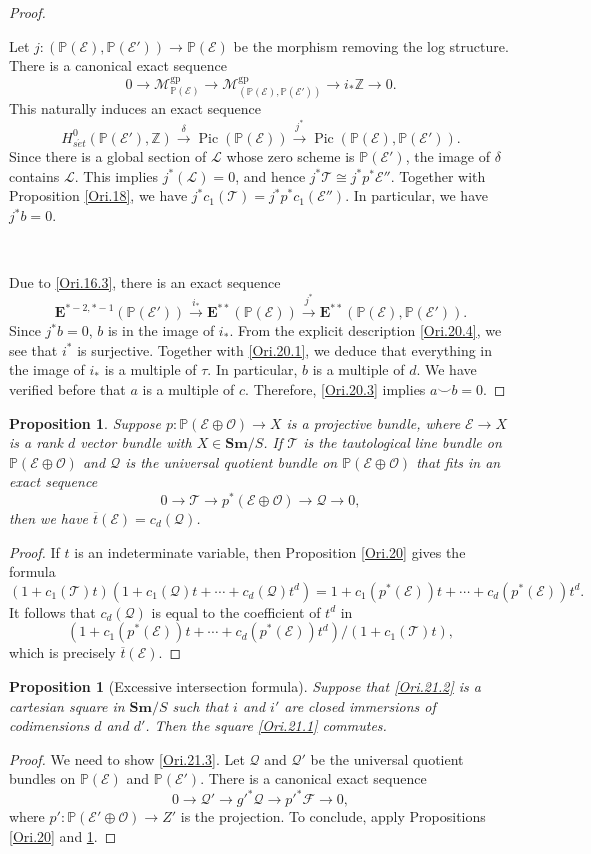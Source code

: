 \documentclass[11pt, a4paper]{amsart}
\newtheorem{prop}[thm]{Proposition}
\theoremstyle{definition}
\numberwithin{equation}{subsection}
\newcommand{\Z}{\mathbb{Z}}
\renewcommand{\P}{\mathbb{P}}
\newcommand{\Sm}{\mathbf{Sm}}
\newcommand{\Pic}{\operatorname{Pic}}		 %
\newcommand{\ol}{\overline}
\newcommand{\gp}{{\mathrm{gp}}}
\newcommand{\set}{{s\acute{e}t}}
\newcommand{\cE}{\mathcal{E}}
\newcommand{\cF}{\mathcal{F}}
\newcommand{\cL}{\mathcal{L}}
\newcommand{\cM}{\mathcal{M}}
\newcommand{\cO}{\mathcal{O}}
\newcommand{\cQ}{\mathcal{Q}}
\newcommand{\cT}{\mathcal{T}}
\newcommand{\ringE}{\mathbf{E}}
\begin{document}
\begin{proof}
\

Let $j\colon (\P(\cE),\P(\cE'))\to \P(\cE)$ be the morphism removing the log structure.
There is a canonical exact sequence
\[
0\to \cM_{\P(\cE)}^\gp \to \cM_{(\P(\cE),\P(\cE'))}^\gp \to i_*\Z\to 0.
\]
This naturally induces an exact sequence
\[
H_{\set}^0(\P(\cE'),\Z)
\xrightarrow{\delta}
\Pic(\P(\cE))
\xrightarrow{j^*}
\Pic(\P(\cE),\P(\cE')).
\]
Since there is a global section of $\cL$ whose zero scheme is $\P(\cE')$, the image of $\delta$ contains $\cL$.
This implies $j^*(\cL)=0$, and hence $j^*\cT\cong j^*p^*\cE''$.
Together with Proposition \ref{Ori.18}, we have $j^*c_1(\cT)=j^*p^*c_1(\cE'')$.
In particular, we have $j^*b=0$.

\

Due to \eqref{Ori.16.3}, there is an exact sequence
\[
\ringE^{*-2,*-1}(\P(\cE'))
\xrightarrow{i_*}
\ringE^{**}(\P(\cE))
\xrightarrow{j^*}
\ringE^{**}(\P(\cE),\P(\cE')).
\]
Since $j^*b=0$, $b$ is in the image of $i_*$.
From the explicit description \eqref{Ori.20.4}, we see that $i^*$ is surjective.
Together with \eqref{Ori.20.1}, we deduce that everything in the image of $i_*$ is a multiple of $\tau$.
In particular, $b$ is a multiple of $d$.
We have verified before that $a$ is a multiple of $c$.
Therefore, \eqref{Ori.20.3} implies $a\smile b=0$.
\end{proof}


\begin{prop}
\label{Ori.25}
Suppose $p\colon \P(\cE\oplus \cO)\to X$ is a projective bundle, where $\cE\to X$ is a rank $d$ vector bundle with $X\in \Sm/S$.
If $\cT$ is the tautological line bundle on $\P(\cE\oplus \cO)$ and $\cQ$ is the universal quotient bundle on $\P(\cE\oplus \cO)$ that fits in an exact sequence
\[
0\to \cT\to p^*(\cE\oplus \cO)\to \cQ\to 0,
\]
then we have $\ol{t}(\cE)=c_d(\cQ)$.
\end{prop}
\begin{proof}
If $t$ is an indeterminate variable, then Proposition \ref{Ori.20} gives the formula
\[
(1+c_1(\cT)t)(1+c_1(\cQ)t+\cdots +c_d(\cQ)t^d)
=
1+c_1(p^*(\cE))t+\cdots+c_{d}(p^*(\cE))t^{d}.
\]
It follows that $c_d(\cQ)$ is equal to the coefficient of $t^d$ in
\[
(1+c_1(p^*(\cE))t+\cdots+c_{d}(p^*(\cE))t^{d})/(1+c_1(\cT)t),
\]
which is precisely $\ol{t}(\cE)$.
\end{proof}


\begin{prop}
[Excessive intersection formula]
\label{Ori.21}
Suppose that \eqref{Ori.21.2} is a cartesian square in $\Sm/S$ such that $i$ and $i'$ 
are closed immersions of codimensions $d$ and $d'$.
Then the square \eqref{Ori.21.1} commutes.
\end{prop}
\begin{proof}
We need to show \eqref{Ori.21.3}.
Let $\cQ$ and $\cQ'$ be the universal quotient bundles on $\P(\cE)$ and $\P(\cE')$.
There is a canonical exact sequence
\[
0 \to \cQ' \to g'^* \cQ \to p'^*\cF \to 0,
\]
where $p'\colon \P(\cE'\oplus \cO)\to Z'$ is the projection.
To conclude, apply Propositions \ref{Ori.20} and \ref{Ori.25}.
\end{proof}
\end{document}
